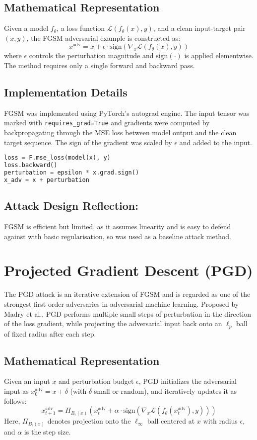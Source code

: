 \subsection*{Mathematical Representation}
Given a model $f_\theta$, a loss function $\mathcal{L}(f_\theta(x), y)$, and a clean input-target pair $(x, y)$, the FGSM adversarial example is constructed as:
\[
x^{\text{adv}} = x + \epsilon \cdot \text{sign} \left( \nabla_x \mathcal{L}(f_\theta(x), y) \right)
\]
where $\epsilon$ controls the perturbation magnitude and $\text{sign}(\cdot)$ is applied elementwise. The method requires only a single forward and backward pass.

\subsection*{Implementation Details}
FGSM was implemented using PyTorch's autograd engine. The input tensor was marked with \texttt{requires\_grad=True} and gradients were computed by backpropagating through the MSE loss between model output and the clean target sequence. The sign of the gradient was scaled by $\epsilon$ and added to the input.

\begin{lstlisting}[language=Python, caption={FGSM adversarial attack implementation}]
loss = F.mse_loss(model(x), y)
loss.backward()
perturbation = epsilon * x.grad.sign()
x_adv = x + perturbation
\end{lstlisting}

\subsection*{Attack Design Reflection:}  
FGSM is efficient but limited, as it assumes linearity and is easy to defend against with basic regularisation, so was used as a baseline attack method.

\section{Projected Gradient Descent (PGD)}

The PGD attack is an iterative extension of FGSM and is regarded as one of the strongest first-order adversaries in adversarial machine learning. Proposed by Madry et al., PGD performs multiple small steps of perturbation in the direction of the loss gradient, while projecting the adversarial input back onto an $\ell_p$ ball of fixed radius after each step.

\subsection*{Mathematical Representation}
Given an input $x$ and perturbation budget $\epsilon$, PGD initializes the adversarial input as $x_0^{\text{adv}} = x + \delta$ (with $\delta$ small or random), and iteratively updates it as follows:
\[
x_{t+1}^{\text{adv}} = \Pi_{B_\epsilon(x)} \left( x_t^{\text{adv}} + \alpha \cdot \text{sign}\left( \nabla_x \mathcal{L}(f_\theta(x_t^{\text{adv}}), y) \right) \right)
\]
Here, $\Pi_{B_\epsilon(x)}$ denotes projection onto the $\ell_\infty$ ball centered at $x$ with radius $\epsilon$, and $\alpha$ is the step size.

